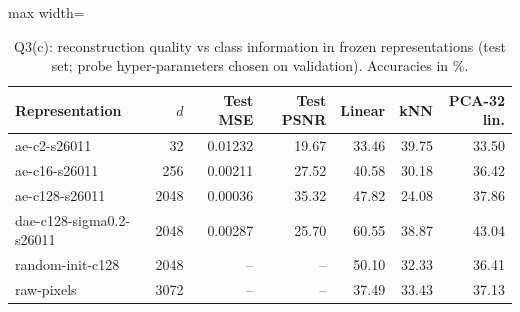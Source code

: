 \begin{table}[!tbp]\centering\footnotesize\setlength{\tabcolsep}{3pt}
\begin{adjustbox}{max width=\textwidth}
\begin{tabular}{lrrrrrr}\toprule
Representation & $d$ & Test MSE & Test PSNR & Linear & kNN & PCA-32 lin. \\\midrule
ae-c2-s26011 & 32 & 0.01232 & 19.67 & 33.46 & 39.75 & 33.50 \\
ae-c16-s26011 & 256 & 0.00211 & 27.52 & 40.58 & 30.18 & 36.42 \\
ae-c128-s26011 & 2048 & 0.00036 & 35.32 & 47.82 & 24.08 & 37.86 \\
dae-c128-sigma0.2-s26011 & 2048 & 0.00287 & 25.70 & 60.55 & 38.87 & 43.04 \\
random-init-c128 & 2048 & -- & -- & 50.10 & 32.33 & 36.41 \\
raw-pixels & 3072 & -- & -- & 37.49 & 33.43 & 37.13 \\
\bottomrule\end{tabular}
\end{adjustbox}
\caption{Q3(c): reconstruction quality vs class information in frozen representations (test set; probe hyper-parameters chosen on validation). Accuracies in \%.}\label{tab:q3c}\end{table}
